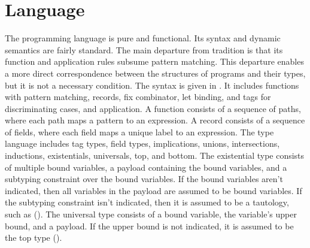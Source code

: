 \documentclass[acmsmall]{acmart}
\begin{document}

\section{Language}
The programming language is pure and functional. Its syntax and dynamic semantics 
are fairly standard. The main departure from tradition is that its function
and application rules subsume pattern matching. This departure enables a more direct  
correspondence between the structures of programs and their types, but it is 
not a necessary condition.
The syntax is given in .
It includes functions with pattern matching, records, fix combinator, let binding, 
and tags for discriminating cases, and application.
A function consists of a sequence of paths, where each path maps a pattern to an expression.
A record consists of a sequence of fields, where each field maps a unique label to an expression. 
The type language includes tag types, field types, implications, unions, intersections, 
inductions, existentials, universals, top, and bottom. 
The existential type consists of multiple bound variables, a payload containing the bound variables, 
and a subtyping constraint over the bound variables. 
If the bound variables aren't indicated, then all variables in the payload are
assumed to be bound variables. If the subtyping constraint isn't indicated, then it is assumed to 
be a tautology, such as ().
The universal type consists of a bound variable, the variable's upper bound, and a payload. If the upper
bound is not indicated, it is assumed to be the top type ().
\end{document}
